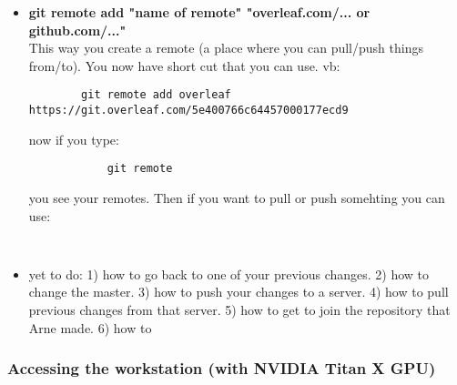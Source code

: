 \documentclass{article}
\begin{document}
\begin{itemize}
\begin{itemize}
        \item \textbf{git remote add "name of remote" "overleaf.com/... or github.com/..."} \\
        This way you create a remote (a place where you can pull/push things from/to). You now have short cut that you can use. vb: 
        \begin{verbatim}
        git remote add overleaf https://git.overleaf.com/5e400766c64457000177ecd9
        \end{verbatim}
        now if you type:
        \begin{verbatim}
            git remote
        \end{verbatim}
        you see your remotes.
        Then if you want to pull or push somehting you can use:
        \begin{verbatim}
            
        \end{verbatim}
        
        \item yet to do: 1) how to go back to one of your previous changes. 2) how to change the master. 3) how to push your changes to a server. 4) how to pull previous changes from that server. 5) how to get to join the repository that Arne made. 6) how to 
    \end{itemize}
\end{itemize}


\subsubsection{Accessing the workstation (with NVIDIA Titan X GPU)}
\end{document}

